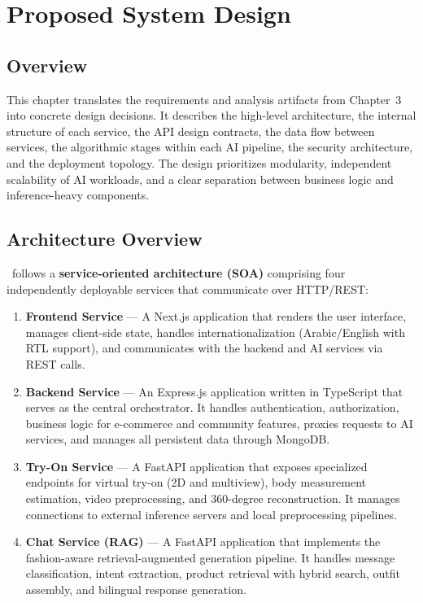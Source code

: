 \chapter{Proposed System Design}

\section{Overview}
This chapter translates the requirements and analysis artifacts from Chapter~3 into concrete design decisions. It describes the high-level architecture, the internal structure of each service, the API design contracts, the data flow between services, the algorithmic stages within each AI pipeline, the security architecture, and the deployment topology. The design prioritizes modularity, independent scalability of AI workloads, and a clear separation between business logic and inference-heavy components.

\section{Architecture Overview}

\projectname\ follows a \textbf{service-oriented architecture (SOA)} comprising four independently deployable services that communicate over HTTP/REST:

\begin{enumerate}[leftmargin=*]
    \item \textbf{Frontend Service} — A Next.js application that renders the user interface, manages client-side state, handles internationalization (Arabic/English with RTL support), and communicates with the backend and AI services via REST calls.

    \item \textbf{Backend Service} — An Express.js application written in TypeScript that serves as the central orchestrator. It handles authentication, authorization, business logic for e-commerce and community features, proxies requests to AI services, and manages all persistent data through MongoDB.

    \item \textbf{Try-On Service} — A FastAPI application that exposes specialized endpoints for virtual try-on (2D and multiview), body measurement estimation, video preprocessing, and 360-degree reconstruction. It manages connections to external inference servers and local preprocessing pipelines.

    \item \textbf{Chat Service (RAG)} — A FastAPI application that implements the fashion-aware retrieval-augmented generation pipeline. It handles message classification, intent extraction, product retrieval with hybrid search, outfit assembly, and bilingual response generation.
\end{enumerate}

